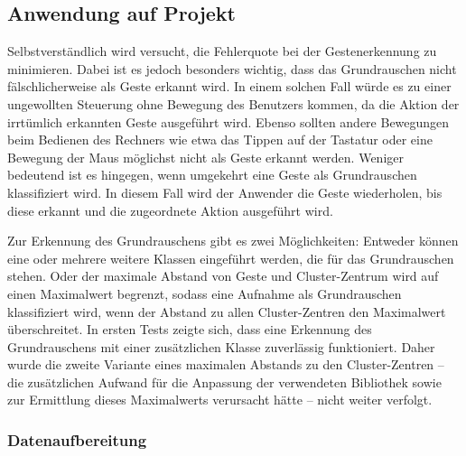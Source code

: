 \subsection{Anwendung auf Projekt}
Selbstverständlich wird versucht, die Fehlerquote bei der Gestenerkennung zu minimieren. Dabei ist es jedoch besonders wichtig, dass das Grundrauschen nicht fälschlicherweise als Geste erkannt wird. In einem solchen Fall würde es zu einer ungewollten Steuerung ohne Bewegung des Benutzers kommen, da die Aktion der irrtümlich erkannten Geste ausgeführt wird. Ebenso sollten andere Bewegungen beim Bedienen des Rechners wie etwa das Tippen auf der Tastatur oder eine Bewegung der Maus möglichst nicht als Geste erkannt werden.
Weniger bedeutend ist es hingegen, wenn umgekehrt eine Geste als Grundrauschen klassifiziert wird. In diesem Fall wird der Anwender die Geste wiederholen, bis diese erkannt und die zugeordnete Aktion ausgeführt wird.

Zur Erkennung des Grundrauschens gibt es zwei Möglichkeiten: Entweder können eine oder mehrere weitere Klassen eingeführt werden, die für das Grundrauschen stehen. Oder der maximale Abstand von Geste und Cluster-Zentrum wird auf einen Maximalwert begrenzt, sodass
eine Aufnahme als Grundrauschen klassifiziert wird, wenn der Abstand zu allen Cluster-Zentren den Maximalwert überschreitet.
In ersten Tests zeigte sich, dass eine Erkennung des Grundrauschens mit einer zusätzlichen Klasse zuverlässig funktioniert. Daher wurde die zweite Variante eines maximalen Abstands zu den Cluster-Zentren -- die zusätzlichen Aufwand für die Anpassung der verwendeten Bibliothek sowie zur Ermittlung dieses Maximalwerts verursacht hätte -- nicht weiter verfolgt.


\subsubsection{Datenaufbereitung}


